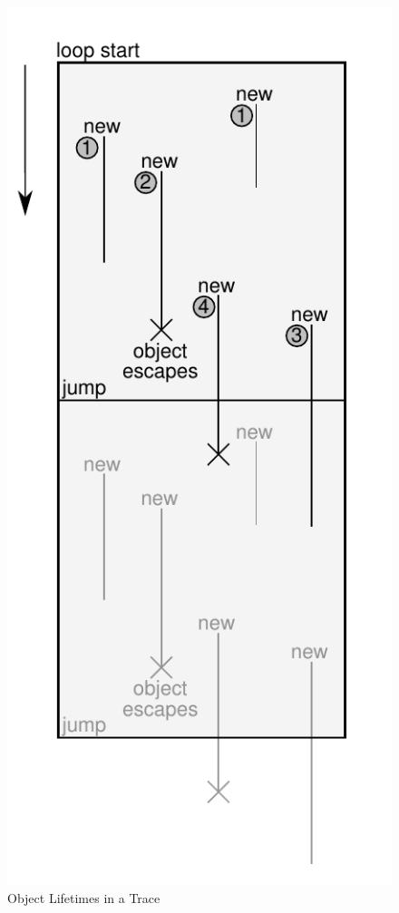 \documentclass{sigplanconf}
\begin{document}
\begin{figure}
\includegraphics{figures/obj-lifetime.pdf}

\caption{Object Lifetimes in a Trace}
\label{fig:lifetimes}
\end{figure}
\end{document}
